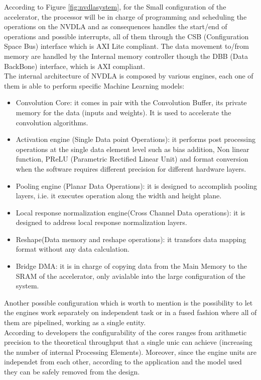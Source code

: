 According to Figure \ref{fig:nvdlasystem}, for the Small configuration of the accelerator, the processor will be in charge of programming and scheduling the operations on the NVDLA and as consequences handles the start/end of operations and possible interrupts, all of them through the CSB (Configuration Space Bus) interface which is AXI Lite compliant\cite{paper:30}. \newline
The data movement to/from memory are handled by the Internal memory controller though the DBB (Data BackBone) interface, which is AXI \cite{paper:30} compliant.\\

The internal architecture of NVDLA is composed by various engines, each one of them is able to perform specific Machine Learning models:
\begin{itemize}
\item  Convolution Core: it comes in pair with the Convolution Buffer, its private memory for the data (inputs and weights). It is used to accelerate the convolution algorithms.
\item Activation engine (Single Data point Operations): it performs post processing operations at the single data element level such as bias addition, Non linear function, PReLU (Parametric Rectified Linear Unit) and format conversion when the software requires different precision for different hardware layers.
\item Pooling engine (Planar Data Operations): it is designed to accomplish pooling layers, i.ie. it executes operation along the width and height plane.
\item Local response normalization engine(Cross Channel Data operations): it is designed to address local response normalization layers.
\item Reshape(Data memory and reshape operations): it transfors data mapping format without any data calculation.
\item Bridge DMA: it is in charge of copying data from the Main Memory to the SRAM of the accelerator, only avialable into the large configuration of the system.
\end{itemize}
Another possible configuration which is worth to mention is the possibility to let the engines work separately on independent task or in a fused fashion where all of them are pipelined, working as a single entity.\\

According to developers the configurability of the cores ranges from arithmetic precision to the theoretical throughput that a single unic can achieve (increasing the number of internal Processing Elements). Moreover, since the engine units are independet from each other, according to the application and the model used they can be safely removed from the design.
\newpage
